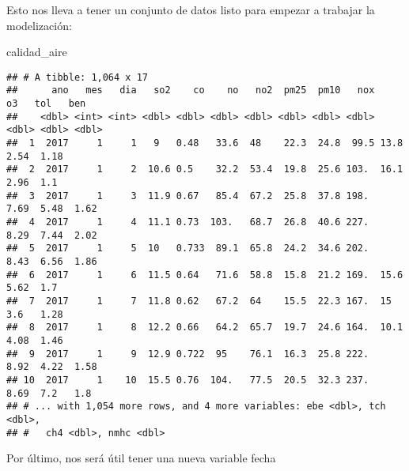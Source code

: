 \documentclass[]{article}
\newenvironment{Shaded}{\begin{snugshade}}{\end{snugshade}}
\newcommand{\DataTypeTok}[1]{\textcolor[rgb]{0.13,0.29,0.53}{#1}}
\newcommand{\KeywordTok}[1]{\textcolor[rgb]{0.13,0.29,0.53}{\textbf{#1}}}
\newcommand{\NormalTok}[1]{#1}
\newcommand{\OperatorTok}[1]{\textcolor[rgb]{0.81,0.36,0.00}{\textbf{#1}}}
\newcommand{\StringTok}[1]{\textcolor[rgb]{0.31,0.60,0.02}{#1}}
\begin{document}
Esto nos lleva a tener un conjunto de datos listo para empezar a
trabajar la modelización:

\begin{Shaded}
\begin{Highlighting}[]
\NormalTok{calidad_aire}
\end{Highlighting}
\end{Shaded}

\begin{verbatim}
## # A tibble: 1,064 x 17
##      ano   mes   dia   so2    co    no   no2  pm25  pm10   nox    o3   tol   ben
##    <dbl> <int> <int> <dbl> <dbl> <dbl> <dbl> <dbl> <dbl> <dbl> <dbl> <dbl> <dbl>
##  1  2017     1     1   9   0.48   33.6  48    22.3  24.8  99.5 13.8   2.54  1.18
##  2  2017     1     2  10.6 0.5    32.2  53.4  19.8  25.6 103.  16.1   2.96  1.1 
##  3  2017     1     3  11.9 0.67   85.4  67.2  25.8  37.8 198.   7.69  5.48  1.62
##  4  2017     1     4  11.1 0.73  103.   68.7  26.8  40.6 227.   8.29  7.44  2.02
##  5  2017     1     5  10   0.733  89.1  65.8  24.2  34.6 202.   8.43  6.56  1.86
##  6  2017     1     6  11.5 0.64   71.6  58.8  15.8  21.2 169.  15.6   5.62  1.7 
##  7  2017     1     7  11.8 0.62   67.2  64    15.5  22.3 167.  15     3.6   1.28
##  8  2017     1     8  12.2 0.66   64.2  65.7  19.7  24.6 164.  10.1   4.08  1.46
##  9  2017     1     9  12.9 0.722  95    76.1  16.3  25.8 222.   8.92  4.22  1.58
## 10  2017     1    10  15.5 0.76  104.   77.5  20.5  32.3 237.   8.69  7.2   1.8 
## # ... with 1,054 more rows, and 4 more variables: ebe <dbl>, tch <dbl>,
## #   ch4 <dbl>, nmhc <dbl>
\end{verbatim}

Por último, nos será útil tener una nueva variable fecha

\begin{Shaded}
\end{Shaded}
\end{document}
